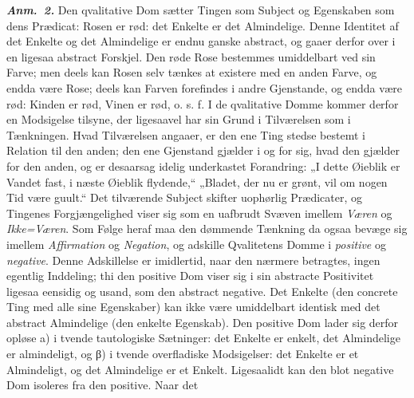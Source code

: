 \documentclass[12pt]{book}
\newcommand{\anm}[1]{\emph{\textbf{Anm.~#1.}}}
\newcommand{\opage}[1]{\marginnote{\footnotesize\textit{[#1]}}}
\begin{document}
\anm{2} Den qvalitative Dom sætter Tingen som Subject og Egenskaben som dens
Prædicat: Rosen er rød: det Enkelte er det Almindelige. Denne Identitet af det
Enkelte og det Almindelige er endnu ganske abstract, og gaaer derfor over i en
ligesaa abstract Forskjel. Den røde Rose bestemmes umiddelbart ved sin Farve;
men deels kan Rosen selv tænkes at existere med en anden Farve, og endda være
Rose; deels kan Farven forefindes i andre Gjenstande, og
\opage{48} endda være rød: Kinden er rød, Vinen er rød, o. s. f. I de qvalitative Domme
kommer derfor en Modsigelse tilsyne, der ligesaavel har sin Grund i Tilværelsen
som i Tænkningen. Hvad Tilværelsen angaaer, er den ene Ting stedse bestemt i
Relation til den anden; den ene Gjenstand gjælder i og for sig, hvad den gjælder
for den anden, og er desaarsag idelig underkastet Forandring: „I dette Øieblik
er Vandet fast, i næste Øieblik flydende,“ „Bladet, der nu er grønt, vil om
nogen Tid være guult.“ Det tilværende Subject skifter uophørlig Prædicater, og
Tingenes Forgjængelighed viser sig som en uafbrudt Svæven imellem \emph{Væren}
og \emph{Ikke=Væren}. Som Følge heraf maa den dømmende Tænkning da ogsaa bevæge
sig imellem \emph{Affirmation} og \emph{Negation}, og adskille Qvalitetens
Domme i \emph{positive} og \emph{negative}. Denne Adskillelse er imidlertid,
naar den nærmere betragtes, ingen egentlig Inddeling; thi den positive Dom viser
sig i sin abstracte Positivitet ligesaa eensidig og usand, som den abstract
negative. Det Enkelte (den concrete Ting med alle sine Egenskaber) kan ikke være
umiddelbart identisk med det abstract Almindelige (den enkelte Egenskab). Den
positive Dom lader sig derfor opløse a) i tvende tautologiske Sætninger: det
Enkelte er enkelt, det Almindelige er almindeligt, og β) i tvende overfladiske
Modsigelser: det Enkelte er et Almindeligt, og det Almindelige er et Enkelt.
Ligesaalidt kan den blot negative Dom isoleres fra den positive. Naar det
\end{document}
